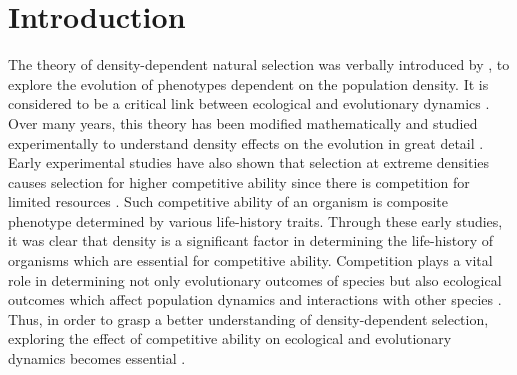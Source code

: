 \chapter{Introduction}
The theory of density-dependent natural selection was verbally introduced by \citet{macarthurGENERALIZEDTHEOREMSNATURAL1962}, \citet*{macarthurTheoryIslandBiogeography1967} to explore the evolution of phenotypes dependent on the population density. It is considered to be a critical link between ecological and evolutionary dynamics \citep{muellerTheoreticalEmpiricalExamination1997}. Over many years, this theory has been modified mathematically and studied experimentally to understand density effects on the evolution in great detail \citep{andersonDensityRegulatedSelectionGenotypic1983,asmussenDensityDependentSelectionIncorporating1983,clarkeDensityDependentSelection1972,muellerTheoreticalEmpiricalExamination1997,roughgardenDensityDependentNaturalSelection1971,santosDensityDependentNaturalSelection1997}. Early experimental studies have also shown that selection at extreme densities causes selection for higher competitive ability since there is competition for limited resources \citep{joshiKselectionAselectionEffectiveness2001}. Such competitive ability of an organism is composite phenotype determined by various life-history traits. Through these early studies, it was clear that density is a significant factor in determining the life-history of organisms which are essential for competitive ability. Competition plays a vital role in determining not only evolutionary outcomes of species but also ecological outcomes which affect population dynamics and interactions with other species \citep{caseIllustratedGuideTheoretical2000a,deyAdaptationLarvalCrowding2012}. Thus, in order to grasp a better understanding of density-dependent selection, exploring the effect of competitive ability on ecological and evolutionary dynamics becomes essential \citep{prasadWhatHaveTwo2003}.  \\\\
